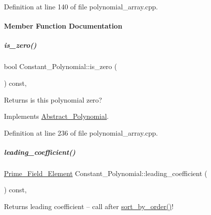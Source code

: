 Definition at line 140 of file polynomial\+\_\+array.\+cpp.



\paragraph{Member Function Documentation}
\mbox{\label{group__polygroup_a14a9a2dbab454f5b20441a51a6000888}} 
\subparagraph{\texorpdfstring{is\+\_\+zero()}{is\_zero()}}
{\footnotesize\ttfamily bool Constant\+\_\+\+Polynomial\+::is\+\_\+zero (\begin{DoxyParamCaption}{ }\end{DoxyParamCaption}) const\hspace{0.3cm}{\ttfamily [override]}, {\ttfamily [virtual]}}

\begin{DoxyReturn}{Returns}
is this polynomial zero? 
\end{DoxyReturn}


Implements \hyperlink{group__polygroup_afb4895702dd56895a792850a831c2f51}{Abstract\+\_\+\+Polynomial}.



Definition at line 236 of file polynomial\+\_\+array.\+cpp.

\mbox{\label{group__polygroup_ab1451de8d6d9f9b0c7df2aef7b32625d}} 
\subparagraph{\texorpdfstring{leading\+\_\+coefficient()}{leading\_coefficient()}}
{\footnotesize\ttfamily \hyperlink{group___fields_group_class_prime___field___element}{Prime\+\_\+\+Field\+\_\+\+Element} Constant\+\_\+\+Polynomial\+::leading\+\_\+coefficient (\begin{DoxyParamCaption}{ }\end{DoxyParamCaption}) const\hspace{0.3cm}{\ttfamily [override]}, {\ttfamily [virtual]}}

\begin{DoxyReturn}{Returns}
leading coefficient -- call after \hyperlink{group__polygroup_a808018b52eca472a7a1b2995e403f35a}{sort\+\_\+by\+\_\+order()}! 
\end{DoxyReturn}


